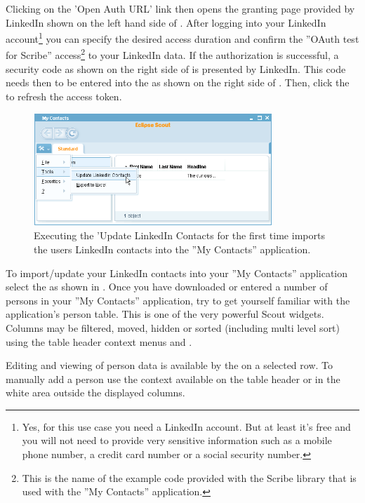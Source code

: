 \documentclass[a4paper,10pt,twoside]{book}
\begin{document}
Clicking on the 'Open Auth URL' link then opens the granting page provided by LinkedIn shown on the left hand side of . 
After logging into your LinkedIn account\footnote{
Yes, for this use case you need a LinkedIn account. But at least it's free and you will not need to provide very sensitive information such as a mobile phone number, a credit card number or a social security number. 
}
you can specify the desired access duration and confirm the ''OAuth test for Scribe'' access\footnote{
This is the name of the example code provided with the Scribe library that is used with the ''My Contacts'' application. 
} 
to your LinkedIn data.
If the authorization is successful, a security code as shown on the right side of  is presented by LinkedIn. 
This code needs then to be entered into the  as shown on the right side of . 
Then, click the  to refresh the access token. 

\begin{figure}
\includegraphics[width=9cm]{my_contacts_rayo_updatecontacts.png} \hspace{5mm}
\caption{Executing the 'Update LinkedIn Contacts for the first time imports the users LinkedIn contacts into the ''My Contacts'' application.}
\end{figure}

To import/update your LinkedIn contacts into your ''My Contacts'' application select the  as shown in .
Once you have downloaded or entered a number of persons in your ''My Contacts'' application, try to get yourself familiar with the application's person table. 
This is one of the very powerful Scout widgets. 
Columns may be filtered, moved, hidden or sorted (including multi level sort) using the table header context menus   and .

Editing and viewing of person data is available by the  on a selected row.
To manually add a person use the context  available on the table header or in the white area outside the displayed columns. 
\end{document}
